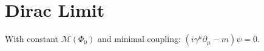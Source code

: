 \section*{Dirac Limit} With constant $\mathcal M(\Phi_0)$ and minimal coupling: $(i\gamma^\mu\partial_\mu - m)\psi=0$.
